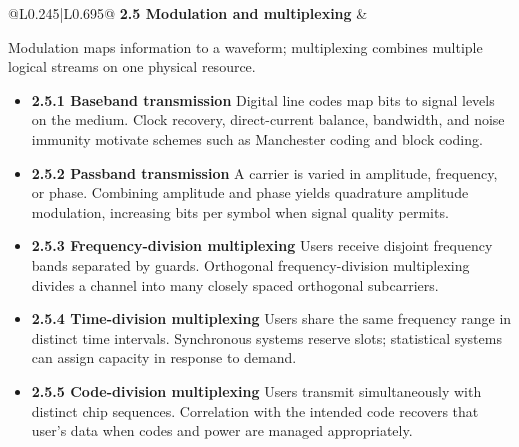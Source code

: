 \documentclass[10pt,letterpaper]{article}
\begin{document}
\begin{longtable}{@{}L{0.245\textwidth}|L{0.695\textwidth}@{}}
\textbf{2.5 Modulation and multiplexing} & \begin{minipage}[t]{\linewidth}\raggedright Modulation maps information to a waveform; multiplexing combines multiple logical streams on one physical resource.\par\begin{itemize}\item \textbf{2.5.1 Baseband transmission} Digital line codes map bits to signal levels on the medium. Clock recovery, direct-current balance, bandwidth, and noise immunity motivate schemes such as Manchester coding and block coding.\item \textbf{2.5.2 Passband transmission} A carrier is varied in amplitude, frequency, or phase. Combining amplitude and phase yields quadrature amplitude modulation, increasing bits per symbol when signal quality permits.\item \textbf{2.5.3 Frequency-division multiplexing} Users receive disjoint frequency bands separated by guards. Orthogonal frequency-division multiplexing divides a channel into many closely spaced orthogonal subcarriers.\item \textbf{2.5.4 Time-division multiplexing} Users share the same frequency range in distinct time intervals. Synchronous systems reserve slots; statistical systems can assign capacity in response to demand.\item \textbf{2.5.5 Code-division multiplexing} Users transmit simultaneously with distinct chip sequences. Correlation with the intended code recovers that user's data when codes and power are managed appropriately.\end{itemize}\end{minipage} \\ \hline

\end{longtable}
\end{document}
